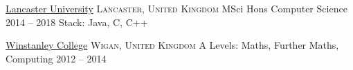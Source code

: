 
\headedsection
{\href{http://www.lancaster.ac.uk/}{Lancaster University}} {\textsc{Lancaster, United Kingdom}} 
{
	\headedsubsection
	{MSci Hons Computer Science} {2014 -- 2018}
	{
	\inlineheadsection
	{Stack:} {Java, C, C++}}
}

\headedsection
{\href{http://www.winstanley.ac.uk/}{Winstanley College}} {\textsc{Wigan, United Kingdom}}
{
	\headedsubsection
	{A Levels: Maths, Further Maths, Computing} {2012 -- 2014}
	{}
}
